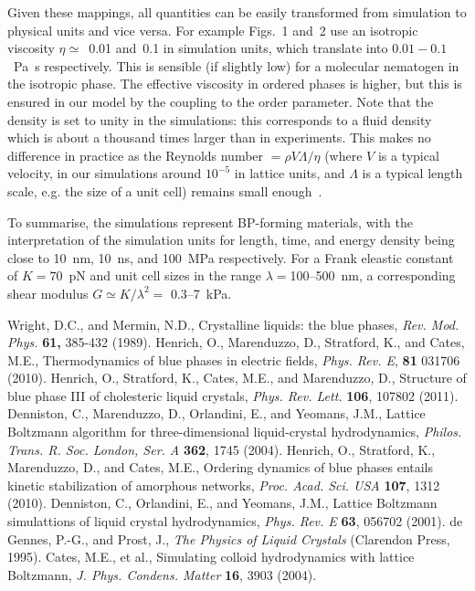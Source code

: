 \documentclass[12pt,twoside]{article}
\begin{document}
Given these mappings, all quantities can be easily transformed from
simulation to physical units and vice versa. For example Figs.~1 and~2
use an isotropic viscosity $\eta \simeq$~0.01 and~0.1 in simulation units,
which translate into $0.01-0.1$~Pa~s respectively. This is sensible (if 
slightly low) for a molecular nematogen in the isotropic phase. 
The effective viscosity in ordered phases is higher, but this is ensured
in our model by the coupling to the order parameter.
Note that the density is set to unity in the simulations: this
corresponds to a fluid density which is about a thousand times larger
than in experiments. This makes no difference in practice as
the Reynolds number $= \rho V\Lambda/\eta$ (where $V$ is a typical
velocity, in our simulations around $10^{-5}$ in lattice units, 
and $\Lambda$ is a typical length scale, e.g. the size of a unit cell) 
remains small enough~\cite{codef}. 

To summarise, the simulations represent BP-forming materials, with the
interpretation of the simulation units for length, time, and energy
density being close to 10~nm, 10~ns, and 100~MPa respectively.
For a Frank eleastic
constant of $K = 70$~pN and unit cell sizes in the range
$\lambda =$100--500~nm, a corresponding shear modulus $G \simeq
K/\lambda^2 =$ 0.3--7~kPa.

\vfill
\pagebreak


\begin{thebibliography}{99}

Wright, D.C., and Mermin, N.D.,
Crystalline liquids: the blue phases,
{\it Rev. Mod. Phys.} {\bf 61,} 385-432 (1989).
Henrich, O., Marenduzzo, D., Stratford, K., and Cates, M.E.,
Thermodynamics of blue phases in electric fields,
\textit{Phys. Rev. E}, \textbf{81} 031706 (2010).
Henrich, O., Stratford, K., Cates, M.E., and Marenduzzo, D.,
Structure of blue phase III of cholesteric liquid crystals,
{\it Phys. Rev. Lett.} {\bf 106}, 107802 (2011).
Denniston, C., Marenduzzo, D., Orlandini, E., and  Yeomans, J.M.,
Lattice Boltzmann algorithm for three-dimensional liquid-crystal
hydrodynamics,
\textit{Philos. Trans. R. Soc. London, Ser. A} \textbf{362}, 1745 (2004).
Henrich, O., Stratford, K.,  Marenduzzo, D., and Cates, M.E.,
Ordering dynamics of blue phases entails kinetic stabilization of
amorphous networks, 
\textit{Proc. Acad. Sci. USA} \textbf{107}, 1312 (2010).
Denniston, C., Orlandini, E., and Yeomans, J.M.,
Lattice Boltzmann simulattions of liquid crystal hydrodynamics,
\textit{Phys. Rev. E} \textbf{63}, 056702 (2001).
de Gennes, P.-G., and  Prost, J.,
{\it The Physics of Liquid Crystals} (Clarendon Press, 1995).
 Cates, M.E.,  et al.,
Simulating colloid hydrodynamics with lattice Boltzmann,
\textit{J. Phys. Condens. Matter} \textbf{16},  3903 (2004). 


\end{thebibliography}
\end{document}
